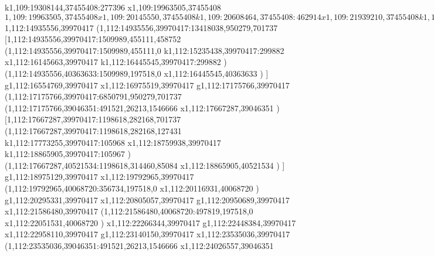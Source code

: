 {k1,109:19308144,37455408:277396
x1,109:19963505,37455408
$1,109:19963505,37455408
x1,109:20145550,37455408
k1,109:20608464,37455408:462914
x1,109:21939210,37455408
k1,109:22214877,37455408:275667
x1,109:22688193,37455408
x1,109:22961259,37455408
k1,109:23236927,37455408:275668
x1,109:24130767,37455408
x1,109:24786129,37455408
x1,109:25059195,37455408
k1,109:25334862,37455408:275667
x1,109:26245086,37455408
k1,109:26520754,37455408:275668
x1,109:27507437,37455408
x1,109:28073596,37455408
k1,109:28349263,37455408:275667
x1,109:31409438,37455408
k1,109:31409438,37455408:0
)
(1,110:11879712,38241840:19529726,455111,127431
x1,110:12862754,38241840
x1,109:13190435,38241840
x1,109:15285768,38241840
g1,109:15504221,38241840
x1,109:17836215,38241840
g1,109:18054668,38241840
x1,109:19365390,38241840
x1,109:19711275,38241840
g1,109:19929728,38241840
x1,109:21935862,38241840
g1,109:22154315,38241840
x1,109:23355812,38241840
k1,110:31409438,38241840:8053626
g1,110:31409438,38241840
)
(1,112:11879712,39970417:16473882,950279,701737
g1,112:14935556,39970417
(1,112:14935556,39970417:13418038,950279,701737
g1,112:14935556,39970417
(1,112:14935556,39970417:0,550500,235932
[1,112:14935556,39970417:0,550500,235932
(1,21:14935556,39970417:0,550500,235932
r1,112:14935556,39970417:0,786432,235932
)
]
)
(1,112:14935556,39970417:13418038,950279,701737
$1,112:14935556,39970417
(1,112:14935556,39970417:13418038,950279,701737
[1,112:14935556,39970417:1509989,455111,458752
(1,112:14935556,39970417:1509989,455111,0
k1,112:15235438,39970417:299882
x1,112:16145663,39970417
k1,112:16445545,39970417:299882
)
(1,112:14935556,40363633:1509989,197518,0
x1,112:16445545,40363633
)
]
g1,112:16554769,39970417
x1,112:16975519,39970417
g1,112:17175766,39970417
(1,112:17175766,39970417:6850791,950279,701737
(1,112:17175766,39046351:491521,26213,1546666
x1,112:17667287,39046351
)
[1,112:17667287,39970417:1198618,282168,701737
(1,112:17667287,39970417:1198618,282168,127431
k1,112:17773255,39970417:105968
x1,112:18759938,39970417
k1,112:18865905,39970417:105967
)
(1,112:17667287,40521534:1198618,314460,85084
x1,112:18865905,40521534
)
]
g1,112:18975129,39970417
x1,112:19792965,39970417
(1,112:19792965,40068720:356734,197518,0
x1,112:20116931,40068720
)
g1,112:20295331,39970417
x1,112:20805057,39970417
g1,112:20950689,39970417
x1,112:21586480,39970417
(1,112:21586480,40068720:497819,197518,0
x1,112:22051531,40068720
)
x1,112:22266344,39970417
g1,112:22448384,39970417
x1,112:22958110,39970417
g1,112:23140150,39970417
x1,112:23535036,39970417
(1,112:23535036,39046351:491521,26213,1546666
x1,112:24026557,39046351
}
